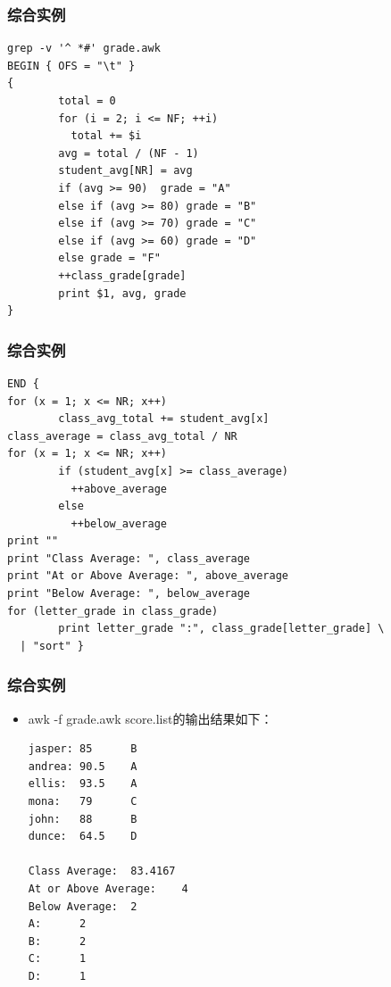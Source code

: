 \documentclass[xcolor=svgnames,presentation]{beamer}
\begin{document}
\begin{frame}[fragile]
\frametitle{综合实例}
\label{sec-2-2-31}


\begin{verbatim}
grep -v '^ *#' grade.awk
BEGIN { OFS = "\t" }
{ 
        total = 0
        for (i = 2; i <= NF; ++i)
          total += $i 
        avg = total / (NF - 1)
        student_avg[NR] = avg
        if (avg >= 90)  grade = "A"
        else if (avg >= 80) grade = "B"
        else if (avg >= 70) grade = "C"
        else if (avg >= 60) grade = "D"
        else grade = "F"        
        ++class_grade[grade]
        print $1, avg, grade 
}
\end{verbatim}
\end{frame}
\begin{frame}[fragile]
\frametitle{综合实例}
\label{sec-2-2-32}


\begin{verbatim}
END {
for (x = 1; x <= NR; x++)
        class_avg_total += student_avg[x]
class_average = class_avg_total / NR
for (x = 1; x <= NR; x++)
        if (student_avg[x] >= class_average)
          ++above_average
        else
          ++below_average
print ""
print "Class Average: ", class_average
print "At or Above Average: ", above_average
print "Below Average: ", below_average     
for (letter_grade in class_grade)
        print letter_grade ":", class_grade[letter_grade] \
  | "sort" }
\end{verbatim}
\end{frame}
\begin{frame}[fragile]
\frametitle{综合实例}
\label{sec-2-2-33}
\begin{itemize}

\item awk -f grade.awk score.list的输出结果如下：\\
\label{sec-2-2-33-1}%
\begin{verbatim}
jasper: 85      B
andrea: 90.5    A
ellis:  93.5    A
mona:   79      C
john:   88      B
dunce:  64.5    D

Class Average:  83.4167
At or Above Average:    4
Below Average:  2
A:      2
B:      2
C:      1
D:      1
\end{verbatim}
\end{itemize} %
\end{frame}
\end{document}
